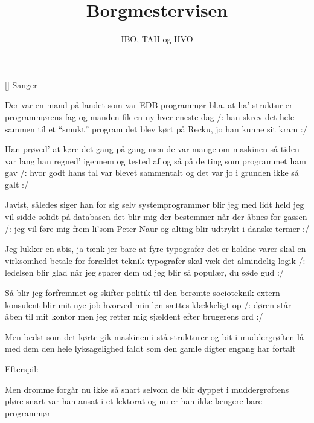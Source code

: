 \documentclass[a4paper,11pt]{article}
\title{Borgmestervisen}
\author{IBO, TAH og HVO}
\begin{document}
\maketitle

\begin{roles}
[] Sanger
\end{roles}

\begin{song}
Der var en mand på landet
som var EDB-programmør bl.a.
at ha' struktur er programmørens fag
og manden fik en ny hver eneste dag
/: han skrev det hele sammen til et "`smukt"' program
det blev kørt på Recku, jo han kunne sit kram :/

Han prøved' at køre det gang på gang
men de var mange om maskinen så tiden var lang
han regned' igennem og tested af
og så på de ting som programmet ham gav
/: hvor godt hans tal var blevet sammentalt
og det var jo i grunden ikke så galt :/

Javist, således siger han for sig selv
systemprogrammør blir jeg med lidt held
jeg vil sidde solidt på databasen
det blir mig der bestemmer når der åbnes for gassen
/: jeg vil føre mig frem li'som Peter Naur
og alting blir udtrykt i danske termer :/

Jeg lukker en abis, ja tænk jer bare
at fyre typografer det er holdne varer
skal en virksomhed betale for forældet teknik
typografer skal væk det almindelig logik
/: ledelsen blir glad når jeg sparer dem ud
jeg blir så populær, du søde gud :/

Så blir jeg forfremmet og skifter politik
til den berømte socioteknik
extern konsulent blir mit nye job
hvorved min løn sættes klækkeligt op
/: døren står åben til mit kontor
men jeg retter mig sjældent efter brugerens ord :/

Men bedst som det kørte gik maskinen i stå
strukturer og bit i muddergrøften lå
med dem den hele lyksagelighed faldt
som den gamle digter engang har fortalt

{\scene Efterspil:}

Men drømme forgår nu ikke så snart
selvom de blir dyppet i muddergrøftens pløre
snart var han ansat i et lektorat
og nu er han ikke længere bare programmør
\end{song}
\end{document}
